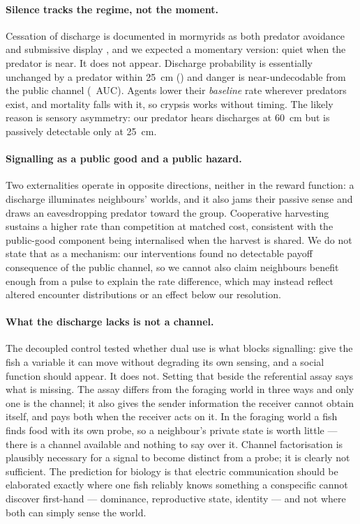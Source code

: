 \paragraph{Silence tracks the regime, not the moment.}
Cessation of discharge is documented in mormyrids as both predator avoidance and
submissive display \citep{stoddard1999predation,moller1989electric}, and we
expected a momentary version: quiet when the predator is near. It does not appear.
Discharge probability is essentially unchanged by a predator within
\SI{25}{\centi\metre} (\SilenceDangerDiff) and danger is near-undecodable from the
public channel (\DangerAUC\ AUC). Agents lower their \emph{baseline} rate wherever
predators exist, and mortality falls with it, so crypsis works without timing. The
likely reason is sensory asymmetry: our predator hears discharges at
\SI{60}{\centi\metre} but is passively detectable only at \SI{25}{\centi\metre}.

\paragraph{Signalling as a public good and a public hazard.}
Two externalities operate in opposite directions, neither in the reward function:
a discharge illuminates neighbours' worlds, and it also jams their passive sense
and draws an eavesdropping predator toward the group. Cooperative harvesting
sustains a higher rate than competition at matched cost, consistent with the
public-good component being internalised when the harvest is shared. We do not
state that as a mechanism: our interventions found no detectable payoff
consequence of the public channel, so we cannot also claim neighbours benefit
enough from a pulse to explain the rate difference, which may instead reflect
altered encounter distributions or an effect below our resolution.

\paragraph{What the discharge lacks is not a channel.}
The decoupled control tested whether dual use is what blocks signalling: give the
fish a variable it can move without degrading its own sensing, and a social
function should appear. It does not. Setting that beside the referential assay
says what is missing. The assay differs from the foraging world in three ways and
only one is the channel; it also gives the sender information the receiver cannot
obtain itself, and pays both when the receiver acts on it. In the foraging world a
fish finds food with its own probe, so a neighbour's private state is worth little
--- there is a channel available and nothing to say over it. Channel factorisation
is plausibly necessary for a signal to become distinct from a probe; it is clearly
not sufficient. The prediction for biology is that electric communication should
be elaborated exactly where one fish reliably knows something a conspecific cannot
discover first-hand --- dominance, reproductive state, identity --- and not where
both can simply sense the world.

